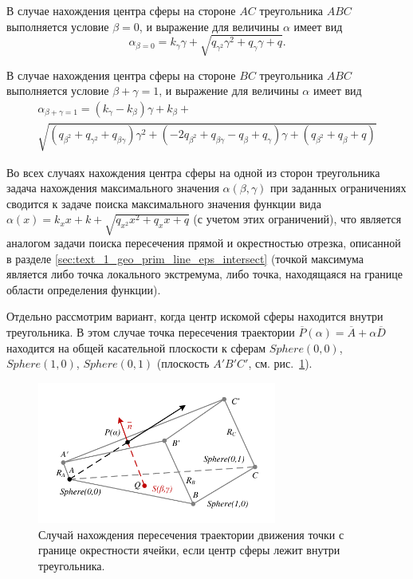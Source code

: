 В случае нахождения центра сферы на стороне $AC$ треугольника $ABC$ выполняется условие $\beta = 0$, и выражение для величины $\alpha$ имеет вид
\begin{equation}
	\alpha_{\beta = 0} = k_{\gamma} \gamma + \sqrt{q_{\gamma^2} \gamma^2 + q_{\gamma} \gamma + q}.
\end{equation}

В случае нахождения центра сферы на стороне $BC$ треугольника $ABC$ выполняется условие $\beta + \gamma = 1$, и выражение для величины $\alpha$ имеет вид
\begin{multline}
	\alpha_{\beta + \gamma = 1} = (k_{\gamma} - k_{\beta}) \gamma + k_{\beta} + \\
	\sqrt{(q_{\beta^2} + q_{\gamma^2} + q_{\beta \gamma}) \gamma^2 + (-2 q_{\beta^2} + q_{\beta \gamma} - q_{\beta} + q_{\gamma}) \gamma + (q_{\beta^2} + q_{\beta} + q)}
\end{multline}

Во всех случаях нахождения центра сферы на одной из сторон треугольника задача нахождения максимального значения $\alpha(\beta, \gamma)$ при заданных ограничениях сводится к задаче поиска максимального значения функции вида $\alpha(x) = k_x x + k + \sqrt{q_{x^2} x^2 + q_x x + q}$ (с учетом этих ограничений), что является аналогом задачи поиска пересечения прямой и окрестностью отрезка, описанной в разделе \ref{sec:text_1_geo_prim_line_eps_intersect} (точкой максимума является либо точка локального экстремума, либо точка, находящаяся на границе области определения функции).

Отдельно рассмотрим вариант, когда центр искомой сферы находится внутри треугольника.
В этом случае точка пересечения траектории $\overline{P}(\alpha) = \overline{A} + \alpha \overline{D}$ находится на общей касательной плоскости к сферам $Sphere(0,0)$, $Sphere(1,0)$, $Sphere(0,1)$ (плоскость $A'B'C'$, см. рис.~\ref{fig:text_1_remesh_common_envelope_3}).

\begin{figure}[ht]
\centering
\includegraphics[width=0.7\textwidth]{fig/3dr_case1.pdf}
\singlespacing
{}\caption{Случай нахождения пересечения траектории движения точки с границе окрестности ячейки, если центр сферы лежит внутри треугольника.}
\label{fig:text_1_remesh_common_envelope_3}
\end{figure}

